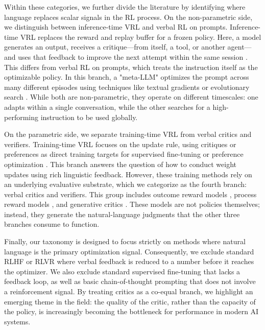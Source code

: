 Within these categories, we further divide the literature by identifying where language replaces scalar signals in the RL process. On the non-parametric side, we distinguish between inference-time VRL and verbal RL on prompts. Inference-time VRL replaces the reward and replay buffer for a frozen policy. Here, a model generates an output, receives a critique—from itself, a tool, or another agent—and uses that feedback to improve the next attempt within the same session \citep{shinn2023reflexion, suzgun2026dynamic, cai2025flex}. This differs from verbal RL on prompts, which treats the instruction itself as the optimizable policy. In this branch, a "meta-LLM" optimizes the prompt across many different episodes using techniques like textual gradients \citep{pryzant2023protegi, yuksekgonul2024textgrad} or evolutionary search \citep{guo2024evoprompt, agrawal2026gepa}. While both are non-parametric, they operate on different timescales: one adapts within a single conversation, while the other searches for a high-performing instruction to be used globally.

On the parametric side, we separate training-time VRL from verbal critics and verifiers. Training-time VRL focuses on the update rule, using critiques or preferences as direct training targets for supervised fine-tuning or preference optimization \citep{luo2025fcp, yuan2025selfrewarding, wang2025cft}. This branch answers the question of how to conduct weight updates using rich linguistic feedback. However, these training methods rely on an underlying evaluative substrate, which we categorize as the fourth branch: verbal critics and verifiers. This group includes outcome reward models \citep{hosseini2024vstar}, process reward models \citep{zhao2025genprm}, and generative critics \citep{mcaleese2024criticgpt}. These models are not policies themselves; instead, they generate the natural-language judgments that the other three branches consume to function.

Finally, our taxonomy is designed to focus strictly on methods where natural language is the primary optimization signal. Consequently, we exclude standard RLHF or RLVR where verbal feedback is reduced to a number before it reaches the optimizer. We also exclude standard supervised fine-tuning that lacks a feedback loop, as well as basic chain-of-thought prompting that does not involve a reinforcement signal. By treating critics as a co-equal branch, we highlight an emerging theme in the field: the quality of the critic, rather than the capacity of the policy, is increasingly becoming the bottleneck for performance in modern AI systems.









